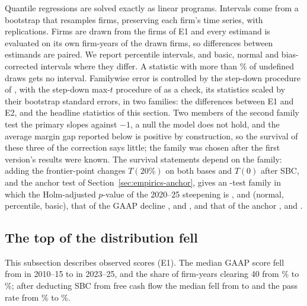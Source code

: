 Quantile regressions are solved exactly as linear programs. Intervals come from a bootstrap that resamples firms, preserving each firm's time series, with \BootB{} replications. Firms are drawn from the \BootFirms{} firms of E1 and every estimand is evaluated on its own firm-years of the drawn firms, so differences between estimands are paired. We report percentile intervals, and basic, normal and bias-corrected intervals where they differ. A statistic with more than \BootNanMax\% of undefined draws gets no interval. Familywise error is controlled by the step-down procedure of \citet{holm1979simple}, with the step-down max-$t$ procedure of \citet{romano2005stepwise} as a check, its statistics scaled by their bootstrap standard errors, in two families: the \ContrN{} differences between E1 and E2, and the \FamBN{} headline statistics of this section. Two members of the second family test the primary slopes against $-1$, a null the model does not hold, and the average margin gap reported below is positive by construction, so the survival of these three of the correction says little; the family was chosen after the first version's results were known. The survival statements depend on the family: adding the frontier-point changes $T(20\%)$ on both bases and $T(0)$ after SBC, and the anchor test of Section~\ref{sec:empirics-anchor}, gives an \FamEighteenN-test family in which the Holm-adjusted $p$-value of the 2020--25 steepening is \HolmEighteenDiffNormal, \HolmEighteenDiffPercentile{} and \HolmEighteenDiffBasic{} (normal, percentile, basic), that of the GAAP decline \HolmEighteenTopNormal, \HolmEighteenTopPercentile{} and \HolmEighteenTopBasic, and that of the anchor \HolmEighteenAnchorNormal, \HolmEighteenAnchorPercentile{} and \HolmEighteenAnchorBasic.

\subsection{The top of the distribution fell}
This subsection describes observed scores (E1). The median GAAP score fell from \VMedOpEarly{} in 2010--15 to \VMedOpLate{} in 2023--25, and the share of firm-years clearing 40 from \VPassOpEarly\% to \VPassOpLate\%; after deducting SBC from free cash flow the median fell from \VMedCashEarly{} to \VMedCashLate{} and the pass rate from \VPassCashEarly\% to \VPassCashLate\%.


